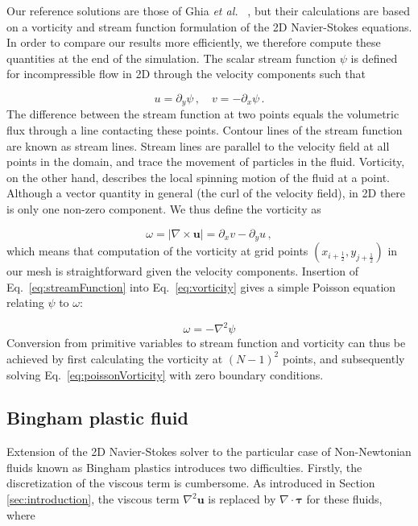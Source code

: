 \documentclass[final,3p,twocolumn]{elsarticle}
\begin{document}
Our reference solutions are those of Ghia {\em et al.\ } \cite{ghia1982high},
but their calculations are based on a vorticity and stream function formulation
of the 2D Navier-Stokes equations. In order to compare our results more
efficiently, we therefore compute these quantities at the end of the
simulation. The scalar stream function $\psi$ is defined for incompressible
flow in 2D through the velocity components such that 

\begin{equation}
    u = \partial_y \psi \,, \quad v = - \partial_x \psi \,.
    \label{eq:streamFunction}
\end{equation}
%
The difference between the stream function at two points equals the
volumetric flux through a line contacting these points. Contour lines of the
stream function are known as stream lines. Stream lines are parallel to the
velocity field at all points in the domain, and trace the movement of particles
in the fluid. Vorticity, on the other hand, describes the local spinning motion
of the fluid at a point. Although a vector quantity in general (the curl of the velocity
field), in 2D there is only one non-zero component. We thus define the
vorticity as 

\begin{equation}
    \omega = |\nabla \times \bm{u}| = \partial_x v - \partial_y u \,,
    \label{eq:vorticity}
\end{equation}
%
which means that computation of the vorticity at grid points
$(x_{i+\frac{1}{2}}, y_{j+\frac{1}{2}})$ in our mesh is straightforward
given the velocity components.  Insertion of Eq.\ \eqref{eq:streamFunction}
into Eq.\ \eqref{eq:vorticity} gives a simple Poisson equation relating $\psi$
to $\omega$: 

\begin{equation}
    \omega = - \nabla^2 \psi
    \label{eq:poissonVorticity}
\end{equation}
%
Conversion from primitive variables to stream function and vorticity can thus
be achieved by first calculating the vorticity at $(N-1)^2$ points, and
subsequently solving Eq.\ \eqref{eq:poissonVorticity} with zero boundary
conditions. 

\subsection{Bingham plastic fluid}
\label{subsec:bingham}

Extension of the 2D Navier-Stokes solver to the particular case of
Non-Newtonian fluids known as Bingham plastics introduces two difficulties.
Firstly, the discretization of the viscous term is cumbersome. As introduced in
Section \ref{sec:introduction}, the viscous term $\nabla^2 \bm{u}$ is replaced
by $\nabla \cdot \bm{\tau}$ for these fluids, where 
\end{document}
